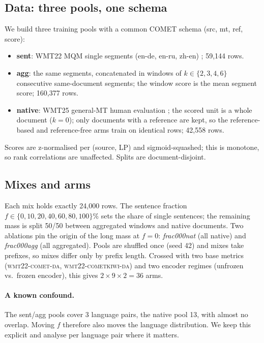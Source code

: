 \documentclass[11pt]{article}
\newcommand{\cometda}{\textsc{wmt22-comet-da}}
\newcommand{\kiwi}{\textsc{wmt22-cometkiwi-da}}
\begin{document}
\subsection{Data: three pools, one schema}

We build three training pools with a common COMET schema (src, mt, ref, score):

\begin{itemize}
\item \textbf{sent}: WMT22 MQM single segments (en-de, en-ru, zh-en) \citep{freitag2022wmt22}; 59{,}144 rows.
\item \textbf{agg}: the same segments, concatenated in windows of $k \in \{2,3,4,6\}$ consecutive same-document segments; the window score is the mean segment score; 160{,}377 rows.
\item \textbf{native}: WMT25 general-MT human evaluation \citep{kocmi2025wmt25}; the scored unit is a whole document ($k{=}0$); only documents with a reference are kept, so the reference-based and reference-free arms train on identical rows; 42{,}558 rows.
\end{itemize}

Scores are z-normalised per (source, LP) and sigmoid-squashed; this is monotone, so rank correlations are unaffected.
Splits are document-disjoint.

\subsection{Mixes and arms}

Each mix holds exactly 24{,}000 rows.
The sentence fraction $f \in \{0, 10, 20, 40, 60, 80, 100\}\%$ sets the share of single sentences; the remaining mass is split 50/50 between aggregated windows and native documents.
Two ablations pin the origin of the long mass at $f{=}0$: \emph{frac000nat} (all native) and \emph{frac000agg} (all aggregated).
Pools are shuffled once (seed 42) and mixes take prefixes, so mixes differ only by prefix length.
Crossed with two base metrics (\cometda{}, \kiwi{}) and two encoder regimes (unfrozen vs.\ frozen encoder), this gives $2 \times 9 \times 2 = 36$ arms.

\paragraph{A known confound.}
The sent/agg pools cover 3 language pairs, the native pool 13, with almost no overlap.
Moving $f$ therefore also moves the language distribution.
We keep this explicit and analyse per language pair where it matters.
\end{document}
